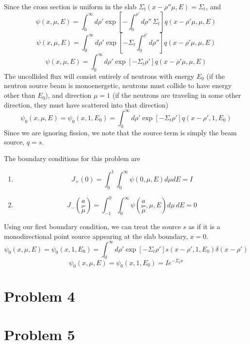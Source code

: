 \documentclass{article}
\newcommand{\Xs}{\Sigma}
\newcommand{\intzi}{\int_0^{\infty}}
\begin{document}
Since the cross section is uniform in the slab $\Xs_t(x-\rho''\mu,E) = \Xs_t$, and
$$ \psi(x,\mu,E) = \intzi d\rho' \exp \left[ -\int_0^{\rho'} d\rho'' \, \Xs_t\right] q(x-\rho'\mu,\mu,E) $$
$$ \psi(x,\mu,E) = \intzi d\rho' \exp \left[ -\Xs_t \int_0^{\rho'} d\rho''\right] q(x-\rho'\mu,\mu,E) $$
$$ \psi(x,\mu,E) = \intzi d\rho' \exp \left[ -\Xs_t \rho'\right] q(x-\rho'\mu,\mu,E) $$
The uncollided flux will consist entirely of neutrons with energy $E_0$ (if the neutron source beam is monoenergetic, neutrons must collide to have energy other than $E_0$), and direction $\mu = 1$ (if the neutrons are traveling in some other direction, they must have scattered into that direction)
$$ \psi_0(x,\mu,E) = \psi_0(x,1,E_0) = \intzi d\rho' \exp \left[ -\Xs_t \rho'\right] q(x-\rho',1,E_0) $$
Since we are ignoring fission, we note that the source term is simply the beam source, $q = s$.

The boundary conditions for this problem are
\begin{enumerate}
\item $$ J_+(0) = \int_0^1 \intzi \psi(0,\mu,E) d\mu dE = I $$
\item $$ J_-\left(\frac{a}{\tilde{\mu}}\right) = \int_{-1}^0 \intzi \psi\left(\frac{a}{\tilde{\mu}},\mu,E\right) d\mu \, dE = 0 $$
\end{enumerate}

Using our first boundary condition, we can treat the source $s$ as if it is a monodirectional point source appearing at the slab boundary, $x=0$. 
$$ \psi_0(x,\mu,E) = \psi_0(x,1,E_0) = \intzi d\rho' \exp \left[ -\Xs_t \rho'\right] s(x-\rho',1,E_0)\delta(x-\rho') $$
$$ \psi_0(x,\mu,E) = \psi_0(x,1,E_0) = I e^{-\Xs_t x} $$




\section*{Problem 4}





\section*{Problem 5}
\end{document}
